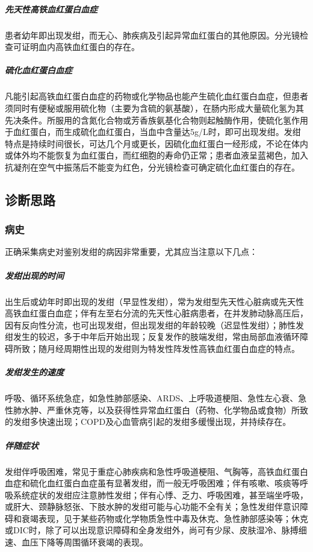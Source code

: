 \subparagraph{先天性高铁血红蛋白血症}

患者幼年即出现发绀，而无心、肺疾病及引起异常血红蛋白的其他原因。分光镜检查可证明血内高铁血红蛋白的存在。

\subparagraph{硫化血红蛋白血症}

凡能引起高铁血红蛋白血症的药物或化学物品也能产生硫化血红蛋白血症，但患者须同时有便秘或服用硫化物（主要为含硫的氨基酸），在肠内形成大量硫化氢为其先决条件。所服用的含氮化合物或芳香族氨基化合物则起触酶作用，使硫化氢作用于血红蛋白，而生成硫化血红蛋白，当血中含量达5g/L时，即可出现发绀。发绀特点是持续时间很长，可达几个月或更长，因硫化血红蛋白一经形成，不论在体内或体外均不能恢复为血红蛋白，而红细胞的寿命仍正常；患者血液呈蓝褐色，加入抗凝剂在空气中振荡后不能变为红色，分光镜检查可确定硫化血红蛋白的存在。

\subsection{诊断思路}

\subsubsection{病史}

正确采集病史对鉴别发绀的病因非常重要，尤其应当注意以下几点：

\subparagraph{发绀出现的时间}

出生后或幼年时即出现的发绀（早显性发绀），常为发绀型先天性心脏病或先天性高铁血红蛋白血症；伴有左至右分流的先天性心脏病患者，在并发肺动脉高压后，因有反向性分流，也可出现发绀，但出现发绀的年龄较晚（迟显性发绀）；肺性发绀发生的较迟，多于中年后开始出现；反复发作的肢端发绀，常由局部血液循环障碍所致；随月经周期性出现的发绀则为特发性阵发性高铁血红蛋白血症的特点。

\subparagraph{发绀发生的速度}

呼吸、循环系统急症，如急性肺部感染、ARDS、上呼吸道梗阻、急性左心衰、急性肺水肿、严重休克等，以及获得性异常血红蛋白（药物、化学物品或食物）所致的发绀多快速出现；COPD及心血管病引起的发绀多缓慢出现，并持续存在。

\subparagraph{伴随症状}

发绀伴呼吸困难，常见于重症心肺疾病和急性呼吸道梗阻、气胸等，高铁血红蛋白血症和硫化血红蛋白血症虽有显著发绀，而一般无呼吸困难；伴有咳嗽、咳痰等呼吸系统症状的发绀应注意肺性发绀；伴有心悸、乏力、呼吸困难，甚至端坐呼吸，或肝大、颈静脉怒张、下肢水肿的发绀可能与心功能不全有关；急性发绀伴意识障碍和衰竭表现，见于某些药物或化学物质急性中毒及休克、急性肺部感染等；休克或DIC时，除了可以出现意识障碍和全身发绀外，尚可有少尿、皮肤湿冷、脉搏细速、血压下降等周围循环衰竭的表现。

